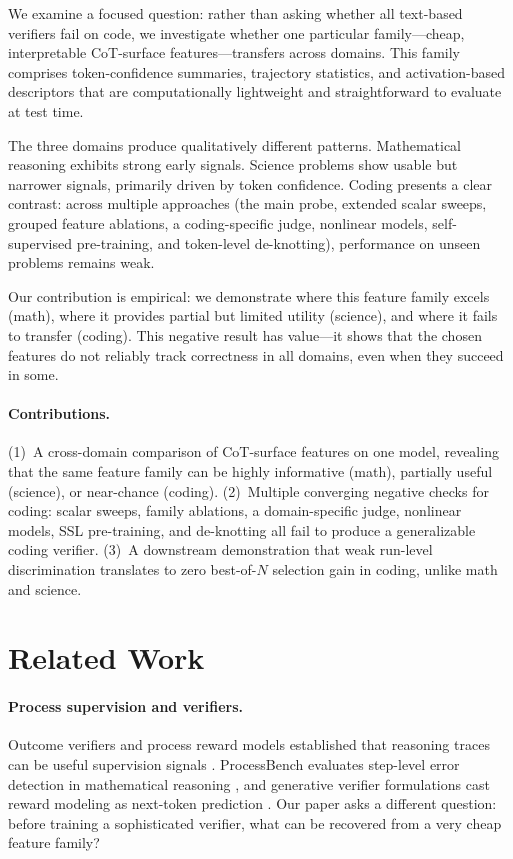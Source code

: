 \documentclass[10pt,twocolumn]{article}
\begin{document}
We examine a focused question: rather than asking whether all text-based verifiers fail on code, we investigate whether one particular family---cheap, interpretable CoT-surface features---transfers across domains. This family comprises token-confidence summaries, trajectory statistics, and activation-based descriptors that are computationally lightweight and straightforward to evaluate at test time.

The three domains produce qualitatively different patterns. Mathematical reasoning exhibits strong early signals. Science problems show usable but narrower signals, primarily driven by token confidence. Coding presents a clear contrast: across multiple approaches (the main probe, extended scalar sweeps, grouped feature ablations, a coding-specific judge, nonlinear models, self-supervised pre-training, and token-level de-knotting), performance on unseen problems remains weak.

Our contribution is empirical: we demonstrate where this feature family excels (math), where it provides partial but limited utility (science), and where it fails to transfer (coding). This negative result has value---it shows that the chosen features do not reliably track correctness in all domains, even when they succeed in some.

\paragraph{Contributions.}
(1)~A cross-domain comparison of CoT-surface features on one model, revealing that the same feature family can be highly informative (math), partially useful (science), or near-chance (coding).
(2)~Multiple converging negative checks for coding: scalar sweeps, family ablations, a domain-specific judge, nonlinear models, SSL pre-training, and de-knotting all fail to produce a generalizable coding verifier.
(3)~A downstream demonstration that weak run-level discrimination translates to zero best-of-$N$ selection gain in coding, unlike math and science.

\section{Related Work}

\paragraph{Process supervision and verifiers.}
Outcome verifiers and process reward models established that reasoning traces can be useful supervision signals \citep{cobbe2021training,lightman2023verify,wang2024mathshepherd}. ProcessBench evaluates step-level error detection in mathematical reasoning \citep{zheng2025processbench}, and generative verifier formulations cast reward modeling as next-token prediction \citep{zhang2025genrm}. Our paper asks a different question: before training a sophisticated verifier, what can be recovered from a very cheap feature family?
\end{document}
